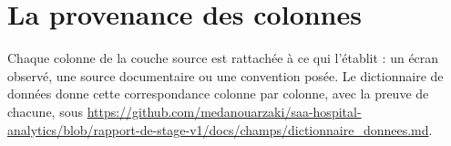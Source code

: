 %
%

\label{annexe:complements}

\section{La provenance des colonnes}\label{sec:complements-provenance}

Chaque colonne de la couche source est rattachée à ce qui l'établit : un écran observé, une source
documentaire ou une convention posée. Le dictionnaire de données donne cette correspondance
colonne par colonne, avec la preuve de chacune, sous \url{https://github.com/medanouarzaki/saa-hospital-analytics/blob/rapport-de-stage-v1/docs/champs/dictionnaire_donnees.md}.

